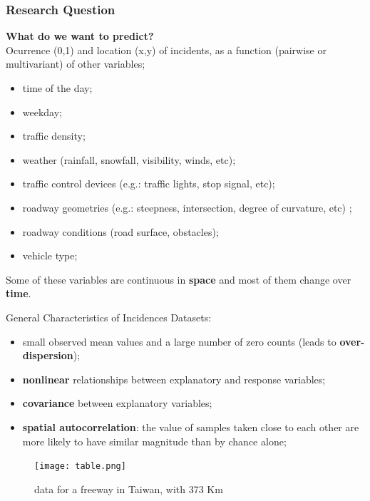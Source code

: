 \documentclass[hyperref={pdfpagelabels=true}]{beamer}
\begin{document}
\begin{frame}
\frametitle{Research Question}
\textbf{ What do we want to predict?}\\
Ocurrence (0,1) and location (x,y) of incidents, as a function (pairwise or multivariant) of other variables;
\small{
\begin{itemize}
\item time of the day;
\item weekday;
\item traffic density;
\item weather (rainfall, snowfall, visibility, winds, etc);
\item traffic control devices (e.g.: traffic lights, stop signal, etc);
\item roadway geometries (e.g.: steepness, intersection, degree of curvature, etc) 
;
\item roadway conditions (road surface, obstacles);
\item vehicle type;
\end{itemize}
}
Some of these variables are continuous in \textbf{space} and most of them change over \textbf{time}.\\
\end{frame}

\begin{frame}
   \begin{block}{General Characteristics of Incidences Datasets:}
    \begin{itemize}      
      \item small observed mean values and a large number of zero counts (leads to \textbf{over-dispersion});
      \item \textbf{nonlinear} relationships between explanatory and response variables;
      \item \textbf{covariance} between explanatory variables;
      \item \textbf{spatial autocorrelation}: the value of samples taken close to each other are more likely to have similar magnitude than by chance alone;      
    \end{itemize}      
    \end{block}
\begin{figure}
\caption{data for a freeway in Taiwan, with 373 Km~\cite{cart}}
\texttt{[image: table.png]}
\end{figure}
\end{frame}
\end{document}
